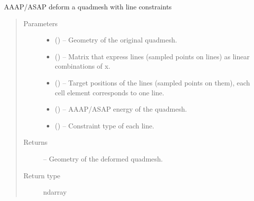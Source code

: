 \documentclass[letterpaper,10pt,english]{sphinxmanual}
\begin{document}
\begin{fulllineitems}
\label{\detokenize{image_aaap:image_aaap.deform_aaap}}
AAAP/ASAP deform a quadmesh with line constraints
\begin{quote}\begin{description}
\item[{Parameters}] \leavevmode\begin{itemize}
\item {} 
 () -- Geometry of the original quadmesh.

\item {} 
 () -- Matrix that express lines (sampled points on lines) as linear
combinations of x.

\item {} 
 () -- Target positions of the lines (sampled points on them), each
cell element corresponds to one line.

\item {} 
 () -- AAAP/ASAP energy of the quadmesh.

\item {} 
 () -- Constraint type of each line.

\end{itemize}

\item[{Returns}] \leavevmode
{} -- Geometry of the deformed quadmesh.

\item[{Return type}] \leavevmode
ndarray

\end{description}\end{quote}

\end{fulllineitems}

\end{document}
